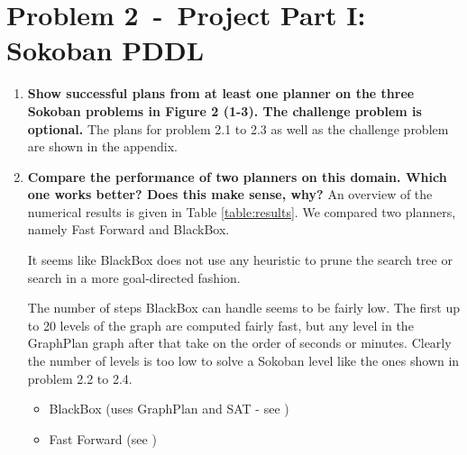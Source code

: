 \documentclass[12pt]{article}
\newcommand{\problem}[2]{\section*{Problem {#1}~-~{#2}}}
\begin{document}
\problem{2}{Project Part I: Sokoban PDDL}
\label{sec:problem_2}
\begin{enumerate}
 \item \textbf{Show successful plans from at least one planner on the three Sokoban problems in Figure 2
(1-3). The challenge problem is optional.}
  The plans for problem 2.1 to 2.3 as well as the challenge problem are shown in the appendix.
 \item \textbf{Compare the performance of two planners on this domain. Which one works better? Does this
make sense, why?} \newline
    An overview of the numerical results is given in Table \ref{table:results}. We compared two planners, namely Fast Forward and BlackBox. 
    
    It seems like BlackBox does not use any heuristic to prune the search tree or search in a more goal-directed fashion. 
    
    The number of steps BlackBox can handle seems to be fairly low. The first up to 20 levels of the graph are computed fairly fast, but any level in the GraphPlan graph after that take on the order of seconds or minutes. Clearly the number of levels is too low to solve a Sokoban level like the ones shown in problem 2.2 to 2.4.

        \begin{itemize}
     \item BlackBox (uses GraphPlan and SAT - see \cite{Blackbox})
     
     \item Fast Forward (see \cite{FastForward})
     

\end{itemize}
\end{enumerate}
\end{document}
